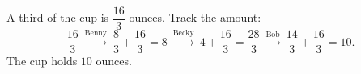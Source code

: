 A third of the cup is \(\dfrac{16}{3}\) ounces. Track the amount:
\[
\dfrac{16}{3}\ \xrightarrow{\text{Benny}}\ \dfrac{8}{3}+\dfrac{16}{3}=8\ \xrightarrow{\text{Becky}}\ 4+\dfrac{16}{3}=\dfrac{28}{3}\ \xrightarrow{\text{Bob}}\ \dfrac{14}{3}+\dfrac{16}{3}=10.
\]
The cup holds \(\boxed{10}\) ounces.
